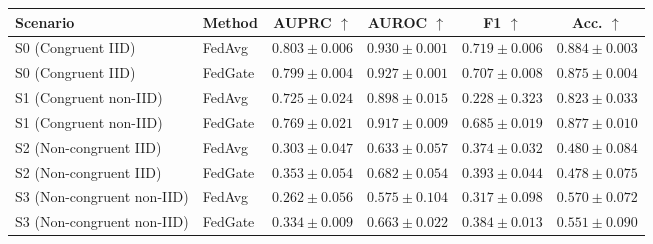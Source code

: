 \begin{tabular}{llcccc}
\toprule
Scenario & Method & AUPRC $\uparrow$ & AUROC $\uparrow$ & F1 $\uparrow$ & Acc. $\uparrow$ \\
\midrule
S0 (Congruent IID) & FedAvg & \textbf{$0.803 \pm 0.006$} & $0.930 \pm 0.001$ & $0.719 \pm 0.006$ & $0.884 \pm 0.003$ \\
S0 (Congruent IID) & FedGate & $0.799 \pm 0.004$ & $0.927 \pm 0.001$ & $0.707 \pm 0.008$ & $0.875 \pm 0.004$ \\
\midrule
S1 (Congruent non-IID) & FedAvg & $0.725 \pm 0.024$ & $0.898 \pm 0.015$ & $0.228 \pm 0.323$ & $0.823 \pm 0.033$ \\
S1 (Congruent non-IID) & FedGate & \textbf{$0.769 \pm 0.021$} & $0.917 \pm 0.009$ & $0.685 \pm 0.019$ & $0.877 \pm 0.010$ \\
\midrule
S2 (Non-congruent IID) & FedAvg & $0.303 \pm 0.047$ & $0.633 \pm 0.057$ & $0.374 \pm 0.032$ & $0.480 \pm 0.084$ \\
S2 (Non-congruent IID) & FedGate & \textbf{$0.353 \pm 0.054$} & $0.682 \pm 0.054$ & $0.393 \pm 0.044$ & $0.478 \pm 0.075$ \\
\midrule
S3 (Non-congruent non-IID) & FedAvg & $0.262 \pm 0.056$ & $0.575 \pm 0.104$ & $0.317 \pm 0.098$ & $0.570 \pm 0.072$ \\
S3 (Non-congruent non-IID) & FedGate & \textbf{$0.334 \pm 0.009$} & $0.663 \pm 0.022$ & $0.384 \pm 0.013$ & $0.551 \pm 0.090$ \\
\bottomrule
\end{tabular}
